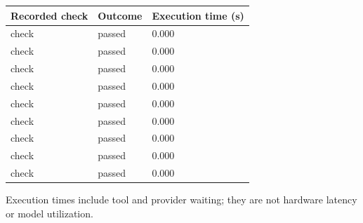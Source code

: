 \documentclass[11pt,a4paper]{article}
\begin{document}
{\small\renewcommand{\arraystretch}{1.18}\begin{longtable}{@{}L{0.57\textwidth}|L{0.16\textwidth}|L{0.17\textwidth}@{}}\toprule

\textbf{Recorded check} & \textbf{Outcome} & \textbf{Execution time (\allowbreak{}s)\allowbreak{}}\\\midrule\endhead

check & passed & 0.000\\[2pt]\hline

check & passed & 0.000\\[2pt]\hline

check & passed & 0.000\\[2pt]\hline

check & passed & 0.000\\[2pt]\hline

check & passed & 0.000\\[2pt]\hline

check & passed & 0.000\\[2pt]\hline

check & passed & 0.000\\[2pt]\hline

check & passed & 0.000\\[2pt]\hline

check & passed & 0.000\\[2pt]\hline

\bottomrule\end{longtable}}

Execution times include tool and provider waiting; they are not hardware latency or model utilization.
\end{document}
